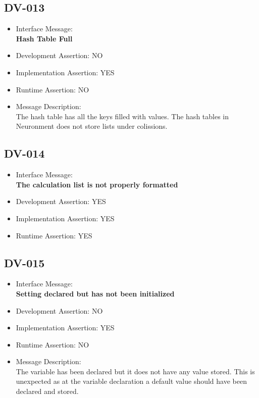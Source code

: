 \subsection{DV-013}
\begin{itemize}
  \item Interface Message:\\[1em]
    \textbf{Hash Table Full}
  \item Development Assertion: NO
  \item Implementation Assertion: YES
  \item Runtime Assertion: NO
  \item Message Description:\\[1em]
    The hash table has all the keys filled with values. The hash tables in Neuronment does not store lists under colissions.
\end{itemize}

\subsection{DV-014}
\begin{itemize}
  \item Interface Message:\\[1em]
    \textbf{The calculation list is not properly formatted}
  \item Development Assertion: YES
  \item Implementation Assertion: YES
  \item Runtime Assertion: YES
\end{itemize}

\subsection{DV-015}
\begin{itemize}
  \item Interface Message:\\[1em]
    \textbf{Setting declared but has not been initialized}
  \item Development Assertion: NO
  \item Implementation Assertion: YES
  \item Runtime Assertion: NO
  \item Message Description:\\[1em]
    The variable has been declared but it does not have any value stored. This is unexpected as at the variable declaration a default value should have been declared and stored.
\end{itemize}


